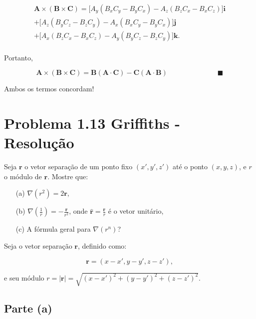 \documentclass[a4paper,12pt]{article}
\begin{document}
\begin{equation}
    \boxed{
    \begin{aligned}
    \mathbf{A} \times (\mathbf{B} \times \mathbf{C}) = \Big[ A_y(B_xC_y - B_yC_x) - A_z(B_zC_x - B_xC_z) \Big] \mathbf{i} \\ +
    \Big[A_z(B_yC_z - B_zC_y) - A_x(B_xC_y - B_yC_x) \Big] \mathbf{j}\\ +
    \Big[ A_x(B_zC_x - B_xC_z) - A_y(B_yC_z - B_zC_y) \Big] \mathbf{k}.
\end{aligned}
    }
\end{equation}\\

Portanto,

\begin{equation}
    \mathbf{A} \times (\mathbf{B} \times \mathbf{C}) =\mathbf{B} (\mathbf{A} \cdot \mathbf{C}) - \mathbf{C} (\mathbf{A} \cdot \mathbf{B}) \hspace{3cm} \blacksquare
\end{equation}


Ambos os termos concordam!


\section*{Problema 1.13 Griffiths - Resolu\c{c}\~ao}

Seja \(\mathbf{r}\) o vetor separação de um ponto fixo \((x', y', z')\) até o ponto \((x, y, z)\), e \(r\) o módulo de \(\mathbf{r}\). Mostre que:

\begin{enumerate}
    \item[(a)] \(\nabla (r^2) = 2\mathbf{r}\),
    \item[(b)] \(\nabla \left(\frac{1}{r}\right) = -\frac{\hat{\mathbf{r}}}{r^2}\), onde \(\hat{\mathbf{r}} = \frac{\mathbf{r}}{r}\) é o vetor unitário,
    \item[(c)] A fórmula geral para \(\nabla (r^n)\)?
\end{enumerate}


Seja o vetor separação \(\mathbf{r}\), definido como:

\begin{equation}
\mathbf{r} = (x - x', y - y', z - z'),
\end{equation}

e seu módulo \(r = |\mathbf{r}| = \sqrt{(x - x')^2 + (y - y')^2 + (z - z')^2}\).

\subsection*{Parte (a)}
\end{document}
